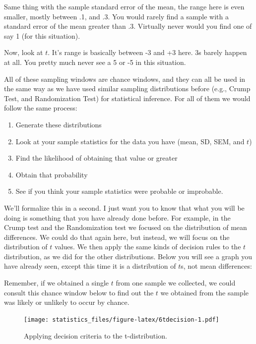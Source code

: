 \documentclass[]{book}
\providecommand{\tightlist}{%
  \setlength{\itemsep}{0pt}\setlength{\parskip}{0pt}}
\begin{document}
Same thing with the sample standard error of the mean, the range here is even smaller, mostly between .1, and .3. You would rarely find a sample with a standard error of the mean greater than .3. Virtually never would you find one of say 1 (for this situation).

Now, look at \(t\). It's range is basically between -3 and +3 here. 3s barely happen at all. You pretty much never see a 5 or -5 in this situation.

All of these sampling windows are chance windows, and they can all be used in the same way as we have used similar sampling distributions before (e.g., Crump Test, and Randomization Test) for statistical inference. For all of them we would follow the same process:

\begin{enumerate}
\def\labelenumi{\arabic{enumi}.}
\tightlist
\item
  Generate these distributions
\item
  Look at your sample statistics for the data you have (mean, SD, SEM, and \(t\))
\item
  Find the likelihood of obtaining that value or greater
\item
  Obtain that probability
\item
  See if you think your sample statistics were probable or improbable.
\end{enumerate}

We'll formalize this in a second. I just want you to know that what you will be doing is something that you have already done before. For example, in the Crump test and the Randomization test we focused on the distribution of mean differences. We could do that again here, but instead, we will focus on the distribution of \(t\) values. We then apply the same kinds of decision rules to the \(t\) distribution, as we did for the other distributions. Below you will see a graph you have already seen, except this time it is a distribution of \(t\)s, not mean differences:

Remember, if we obtained a single \(t\) from one sample we collected, we could consult this chance window below to find out the \(t\) we obtained from the sample was likely or unlikely to occur by chance.

\begin{figure}
\centering
\texttt{[image: statistics\_files/figure-latex/6tdecision-1.pdf]}
\caption{\label{fig:6tdecision}Applying decision criteria to the t-distribution.}
\end{figure}
\end{document}

